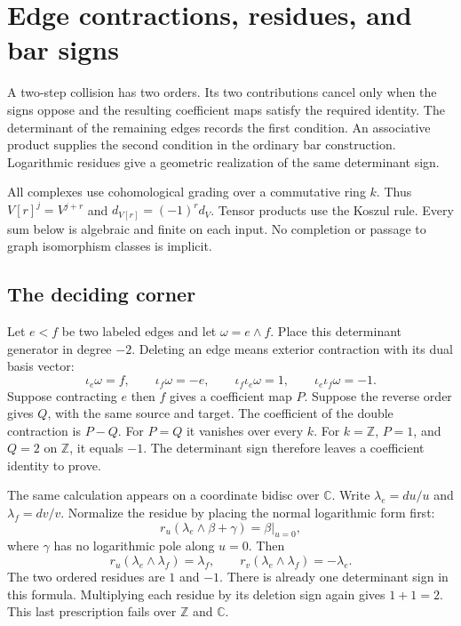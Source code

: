 \section{Edge contractions, residues, and bar signs}
\label{sec:edge-contraction-signs}

A two-step collision has two orders. Its two contributions cancel only when
the signs oppose and the resulting coefficient maps satisfy the required identity.
The determinant of the remaining edges records the first condition.
An associative product supplies the second condition in the ordinary bar construction.
Logarithmic residues give a geometric realization of the same determinant sign.

All complexes use cohomological grading over a commutative ring $k$.
Thus $V[r]^j=V^{j+r}$ and $d_{V[r]}=(-1)^r d_V$.
Tensor products use the Koszul rule.
Every sum below is algebraic and finite on each input.
No completion or passage to graph isomorphism classes is implicit.

\subsection{The deciding corner}
\label{subsec:deciding-corner}

Let $e<f$ be two labeled edges and let $\omega=e\wedge f$.
Place this determinant generator in degree $-2$.
Deleting an edge means exterior contraction with its dual basis vector:
\begin{equation}
\label{eq:two-edge-deletion}
\iota_e\omega=f,\qquad \iota_f\omega=-e,\qquad
\iota_f\iota_e\omega=1,\qquad \iota_e\iota_f\omega=-1.
\end{equation}
Suppose contracting $e$ then $f$ gives a coefficient map $P$.
Suppose the reverse order gives $Q$, with the same source and target.
The coefficient of the double contraction is $P-Q$.
For $P=Q$ it vanishes over every $k$.
For $k=\mathbb Z$, $P=1$, and $Q=2$ on $\mathbb Z$, it equals $-1$.
The determinant sign therefore leaves a coefficient identity to prove.

The same calculation appears on a coordinate bidisc over $\mathbb C$.
Write $\lambda_e=du/u$ and $\lambda_f=dv/v$.
Normalize the residue by placing the normal logarithmic form first:
\begin{equation}
\label{eq:left-residue}
r_u(\lambda_e\wedge\beta+\gamma)=\beta|_{u=0},
\end{equation}
where $\gamma$ has no logarithmic pole along $u=0$.
Then
\[
r_u(\lambda_e\wedge\lambda_f)=\lambda_f,\qquad
r_v(\lambda_e\wedge\lambda_f)=-\lambda_e.
\]
The two ordered residues are $1$ and $-1$.
There is already one determinant sign in this formula.
Multiplying each residue by its deletion sign again gives $1+1=2$.
This last prescription fails over $\mathbb Z$ and $\mathbb C$.


